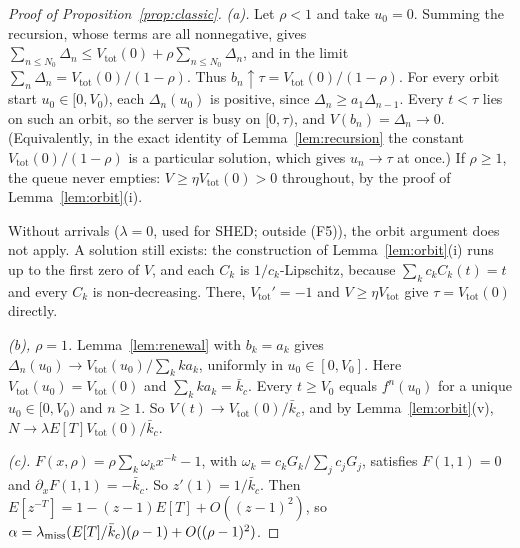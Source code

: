 \begin{proof}[Proof of Proposition~\ref{prop:classic}]
\emph{(a).} Let $\rho<1$ and take $u_0=0$. Summing the recursion, whose terms are all nonnegative, gives
$\sum_{n\le N_0}\Delta_n\le V_{\mathrm{tot}}(0)+\rho\sum_{n\le N_0}\Delta_n$, and in the limit
$\sum_n\Delta_n=V_{\mathrm{tot}}(0)/(1-\rho)$. Thus $b_n\uparrow\tau=V_{\mathrm{tot}}(0)/(1-\rho)$. For every orbit start
$u_0\in[0,V_0)$, each $\Delta_n(u_0)$ is positive, since $\Delta_n\ge a_1\Delta_{n-1}$. Every $t<\tau$ lies on such an
orbit, so the server is busy on $[0,\tau)$, and $V(b_n)=\Delta_n\to0$. (Equivalently, in the exact identity of
Lemma~\ref{lem:recursion} the constant $V_{\mathrm{tot}}(0)/(1-\rho)$ is a particular solution, which gives $u_n\to\tau$ at once.) If
$\rho\ge1$, the queue never empties: $V\ge\eta V_{\mathrm{tot}}(0)>0$ throughout, by the proof of Lemma~\ref{lem:orbit}(i).

Without arrivals ($\lambda=0$, used for SHED; outside (F5)), the orbit argument does not apply. A solution still exists: the
construction of Lemma~\ref{lem:orbit}(i) runs up to the first zero of $V$, and each $C_k$ is $1/c_k$-Lipschitz, because
$\sum_kc_kC_k(t)=t$ and every $C_k$ is non-decreasing. There, $V_{\mathrm{tot}}'=-1$ and $V\ge\eta V_{\mathrm{tot}}$ give
$\tau=V_{\mathrm{tot}}(0)$ directly.

\emph{(b), $\rho=1$.} Lemma~\ref{lem:renewal} with $b_k=a_k$ gives $\Delta_n(u_0)\to V_{\mathrm{tot}}(u_0)/\sum_kka_k$,
uniformly in $u_0\in[0,V_0]$. Here $V_{\mathrm{tot}}(u_0)=V_{\mathrm{tot}}(0)$ and $\sum_kka_k=\bar k_c$. Every
$t\ge V_0$ equals $f^n(u_0)$ for a unique $u_0\in[0,V_0)$ and $n\ge1$. So
$V(t)\to V_{\mathrm{tot}}(0)/\bar k_c$, and by Lemma~\ref{lem:orbit}(v), $N\to\lambda E[T]V_{\mathrm{tot}}(0)/\bar k_c$.

\emph{(c).} $F(x,\rho)=\rho\sum_k\omega_kx^{-k}-1$, with $\omega_k=c_kG_k/\sum_jc_jG_j$, satisfies $F(1,1)=0$ and
$\partial_xF(1,1)=-\bar k_c$. So $z'(1)=1/\bar k_c$. Then $E[z^{-T}]=1-(z-1)E[T]+O((z-1)^2)$, so
$\alpha=\lambda_{\mathrm{miss}}(E[T]/\bar k_c)(\rho-1)+O((\rho-1)^2)$.
\end{proof}

